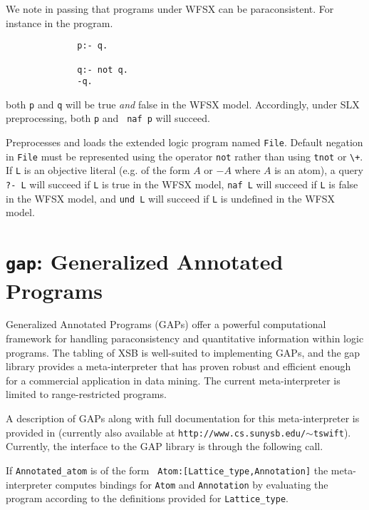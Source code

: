 We note in passing that programs under WFSX can be paraconsistent.
For instance in the program.

\begin{verbatim}
              p:- q.

              q:- not q.
              -q.
\end{verbatim}

both {\tt p} and {\tt q} will be true {\em and} false in the WFSX
model.  Accordingly, under SLX preprocessing, both {\tt p} and {\tt
naf p} will succeed.

\begin{description}
Preprocesses and loads the extended logic program named {\tt File}.
Default negation in {\tt File} must be represented using the operator
{\tt not} rather than using {\tt tnot} or \verb|\+|.  If {\tt L} is an
objective literal (e.g. of the form $A$ or $-A$ where $A$ is an atom),
a query {\tt ?- L} will succeed if {\tt L} is true in the WFSX model,
{\tt naf L} will succeed if {\tt L} is false in the WFSX model, and
{\tt und L} will succeed if {\tt L} is undefined in the WFSX model.
\end{description}


\section{{\tt gap}: Generalized Annotated Programs}
\label{library_utilities:gap} 

Generalized Annotated Programs (GAPs) \cite{KiSu92} offer a powerful
computational framework for handling paraconsistency and quantitative
information within logic programs.  The tabling of XSB is well-suited
to implementing GAPs, and the gap library provides a meta-interpreter
that has proven robust and efficient enough for a commercial
application in data mining.  The current meta-interpreter is limited
to range-restricted programs.

A description of GAPs along with full documentation for this
meta-interpreter is provided in \cite{Swif99a} (currently also
available at {\tt http://www.cs.sunysb.edu/$\sim$tswift}).  Currently, the
interface to the GAP library is through the following call.

\begin{description}
%
If {\tt Annotated\_atom} is of the form {\tt
Atom:[Lattice\_type,Annotation]} the meta-interpreter computes bindings
for {\tt Atom} and {\tt Annotation} by evaluating the program
according to the definitions provided for {\tt Lattice\_type}.
\end{description}



